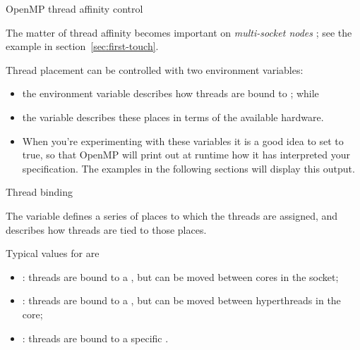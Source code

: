 

 {OpenMP thread affinity control}
\label{sec:omp-proc-bind}

The matter of thread affinity becomes important on \emph{multi-socket nodes}%
;
see the example in section~\ref{sec:first-touch}.

Thread placement can be controlled with two environment variables:
\begin{itemize}
\item the environment variable 
  describes how threads are bound to ; while
\item the variable  describes these places
  in terms of the available hardware.
\item When you're experimenting with these variables it is a good idea
  to set  to true, so that OpenMP will
  print out at runtime how it has interpreted your specification.
  The examples in the following sections will display this output.
\end{itemize}

 {Thread binding}
\label{omp:threadbind}

The variable  defines a series of places to
which the threads are assigned,
and  describes how threads are tied to those places.

Typical values for  are
\begin{itemize}
\item {}: threads are bound to a , but can be
  moved between cores in the socket;
\item {}: threads are bound to a , but
  can be moved between hyperthreads in the core;
\item {}: threads are bound to a specific .
\end{itemize}

